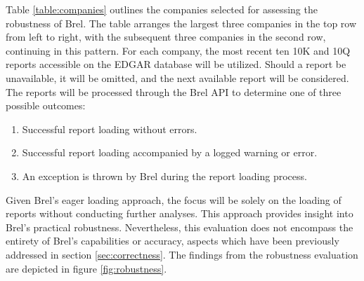 
Table \ref{table:companies} outlines the companies selected for assessing the robustness of Brel.
The table arranges the largest three companies in the top row from left to right, with the subsequent three companies in the second row, continuing in this pattern.
For each company, the most recent ten 10K and 10Q reports accessible on the EDGAR database\cite{sec_edgar} will be utilized.
Should a report be unavailable, it will be omitted, and the next available report will be considered.
The reports will be processed through the Brel API to determine one of three possible outcomes:

\begin{enumerate}
\item Successful report loading without errors.
\item Successful report loading accompanied by a logged warning or error.
\item An exception is thrown by Brel during the report loading process.
\end{enumerate}

Given Brel's eager loading approach, the focus will be solely on the loading of reports without conducting further analyses.
This approach provides insight into Brel's practical robustness.
Nevertheless, this evaluation does not encompass the entirety of Brel's capabilities or accuracy, aspects which have been previously addressed in section \ref{sec:correctness}.
The findings from the robustness evaluation are depicted in figure \ref{fig:robustness}.

